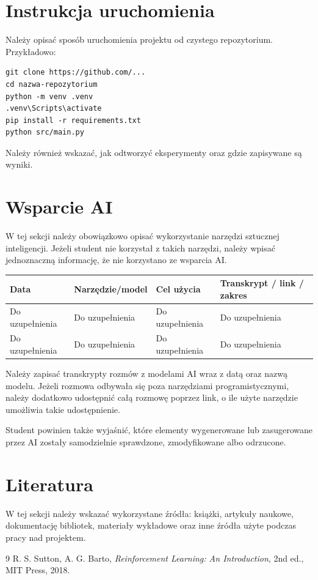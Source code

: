 \documentclass[12pt]{article}
\begin{document}
\section{Instrukcja uruchomienia}

Należy opisać sposób uruchomienia projektu od czystego repozytorium. Przykładowo:

\begin{verbatim}
git clone https://github.com/...
cd nazwa-repozytorium
python -m venv .venv
.venv\Scripts\activate
pip install -r requirements.txt
python src/main.py
\end{verbatim}

Należy również wskazać, jak odtworzyć eksperymenty oraz gdzie zapisywane są wyniki.

\section{Wsparcie AI}

W tej sekcji należy obowiązkowo opisać wykorzystanie narzędzi sztucznej inteligencji. Jeżeli student nie korzystał z takich narzędzi, należy wpisać jednoznaczną informację, że nie korzystano ze wsparcia AI.

\begin{center}
\begin{tabular}{p{}p{}p{}p{}}
\toprule
Data & Narzędzie/model & Cel użycia & Transkrypt / link / zakres \\
\midrule
Do uzupełnienia & Do uzupełnienia & Do uzupełnienia & Do uzupełnienia \\
Do uzupełnienia & Do uzupełnienia & Do uzupełnienia & Do uzupełnienia \\
\bottomrule
\end{tabular}
\end{center}

Należy zapisać transkrypty rozmów z modelami AI wraz z datą oraz nazwą modelu. Jeżeli rozmowa odbywała się poza narzędziami programistycznymi, należy dodatkowo udostępnić całą rozmowę poprzez link, o ile użyte narzędzie umożliwia takie udostępnienie.

Student powinien także wyjaśnić, które elementy wygenerowane lub zasugerowane przez AI zostały samodzielnie sprawdzone, zmodyfikowane albo odrzucone.

\section{Literatura}

W tej sekcji należy wskazać wykorzystane źródła: książki, artykuły naukowe, dokumentację bibliotek, materiały wykładowe oraz inne źródła użyte podczas pracy nad projektem.

\begin{thebibliography}{9}
R. S. Sutton, A. G. Barto, \textit{Reinforcement Learning: An Introduction}, 2nd ed., MIT Press, 2018.
\end{thebibliography}
\end{document}

